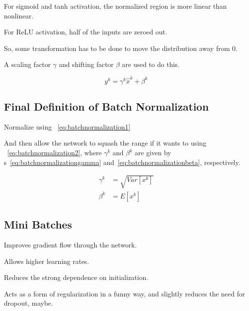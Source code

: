 	\vspace{\baselineskip}
	\begin{bulletedlist}
		\item For sigmoid and tanh activation, the normalized region is more linear than nonlinear.
		\item For ReLU activation, half of the inputs are zeroed out.
		\item So, some transformation has to be done to move the distribution away from 0.
		\item A scaling factor $\gamma$ and shifting factor $\beta$ are used to do this.
	\end{bulletedlist}

	\begin{equation}
		y^k = \gamma^k \hat{x}^k + \beta^k
		\label{eq:batchnormalization2}
	\end{equation}

	\subsection{Final Definition of Batch Normalization}
	\begin{numberedlist}
		\item Normalize using \equationname~\ref{eq:batchnormalization1}
		\item And then allow the network to squash the range if it wants to using \equationname~\ref{eq:batchnormalization2}, where $\gamma^k$ and $\beta^k$ are given by \equationname{}s~\ref{eq:batchnormalizationgamma} and~\ref{eq:batchnormalizationbeta}, respectively.
	\end{numberedlist}

	\begin{align}
		\gamma^k &= \sqrt{Var\left[x^k \right]} \label{eq:batchnormalizationgamma} \\
		\beta^k  &= E\left[x^k \right]          \label{eq:batchnormalizationbeta}
	\end{align}

	\subsection{Mini Batches}

	\begin{bulletedlist}
		\item Improves gradient flow through the network.
		\item Allows higher learning rates.
		\item Reduces the strong dependence on initialization.
		\item Acts as a form of regularization in a funny way, and slightly reduces the need for dropout, maybe.
	\end{bulletedlist}

